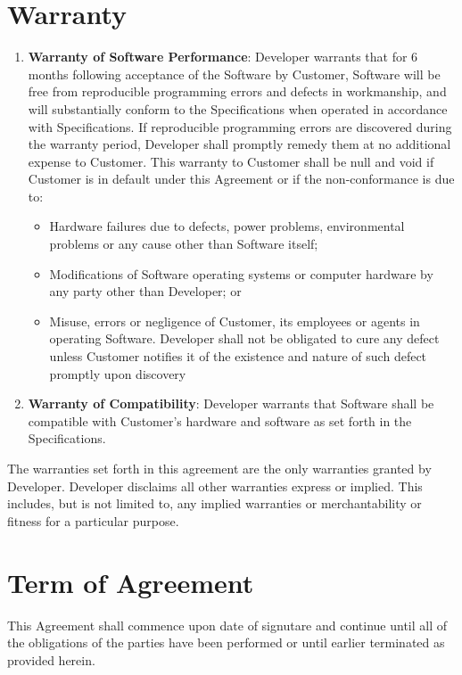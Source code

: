 \documentclass[11pt]{article}
\begin{document}
\section{Warranty}
\begin{enumerate}
\renewcommand{\labelenumi}{(\Alph{enumi})}
\item {\bf Warranty of Software Performance}: Developer warrants that for 6 months following acceptance of the Software by Customer, Software will be free from reproducible programming errors and defects in workmanship, and will substantially conform to the Specifications when operated in accordance with Specifications. If reproducible programming errors are discovered during the warranty period, Developer shall promptly remedy them at no additional expense to Customer. This warranty to Customer shall be null and void if Customer is in default under this Agreement or if the non-conformance is due to:
\begin{itemize}
\item Hardware failures due to defects, power problems, environmental problems or any cause other than Software itself;
\item Modifications of Software operating systems or computer hardware by any party other than Developer; or
\item Misuse, errors or negligence of Customer, its employees or agents in operating Software. Developer shall not be obligated to cure any defect unless Customer notifies it of the existence and nature of such defect promptly upon discovery
\end{itemize}
\item {\bf  Warranty of Compatibility}: Developer warrants that Software shall be compatible with Customer's hardware and software as set forth in the Specifications. 
\end{enumerate}
The warranties set forth in this agreement are the only warranties granted by Developer. Developer disclaims all other warranties express or implied. This includes, but is not limited to, any implied warranties or merchantability or fitness for a particular purpose.
\section{Term of Agreement}
This Agreement shall commence upon date of signutare and continue until all of the obligations of the parties have been performed or until earlier terminated as provided herein.
\end{document}
